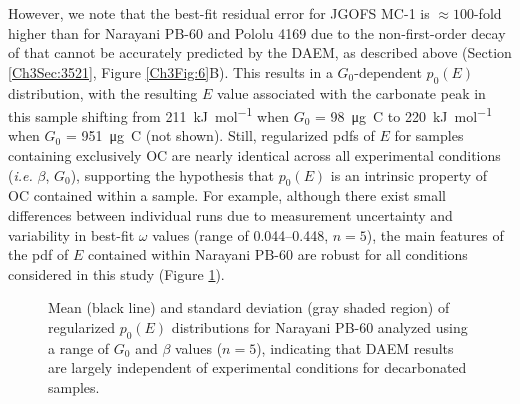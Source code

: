 However, we note that the best-fit residual error for JGOFS MC-1 is $\approx 100$-fold higher than for Narayani PB-60 and Pololu 4169 due to the non-first-order decay of  that cannot be accurately predicted by the DAEM, as described above (Section \ref{Ch3Sec:3521}, Figure \ref{Ch3Fig:6}B). This results in a $G_{0}$-dependent $p_{0}(E)$ distribution, with the resulting $E$ value associated with the carbonate peak in this sample shifting from \SI{211}{kJ.mol^{-1}} when $G_{0}$ = \SI{98}{\micro g.C} to \SI{220}{kJ.mol^{-1}} when $G_{0}$ = \SI{951}{\micro g.C} (not shown). Still, regularized pdfs of $E$ for samples containing exclusively OC are nearly identical across all experimental conditions (\textit{i.e.} $\beta$, $G_{0}$), supporting the hypothesis that $p_{0}(E)$ is an intrinsic property of OC contained within a sample. For example, although there exist small differences between individual runs due to measurement uncertainty and variability in best-fit $\omega$ values (range of \numrange{0.044}{0.448}, $n=5$), the main features of the pdf of $E$ contained within Narayani PB-60 are robust for all conditions considered in this study (Figure \ref{Ch3Fig:7}). 

\begin{figure}[t]
	\caption[Average Narayani PB-60 $p_{0}(E)$ distribution for all experimental conditions]{Mean (black line) and standard deviation (gray shaded region) of regularized $p_{0}(E)$ distributions for Narayani PB-60 analyzed using a range of $G_{0}$ and $\beta$ values ($n = 5$), indicating that DAEM results are largely independent of experimental conditions for decarbonated samples.}
	\label{Ch3Fig:7} 
\end{figure}

